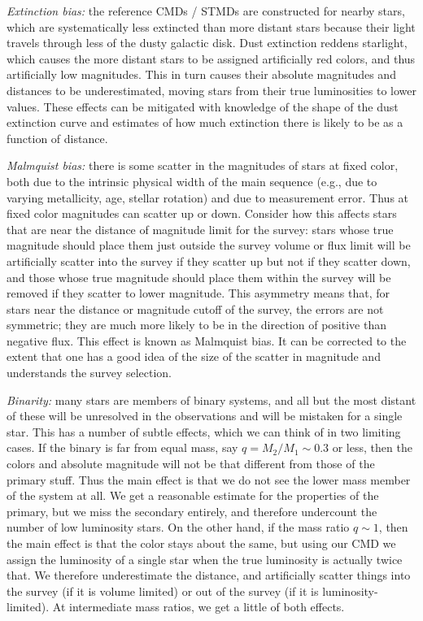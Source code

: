 \textit{Extinction bias:} the reference CMDs / STMDs are constructed for nearby stars, which are systematically less extincted than more distant stars because their light travels through less of the dusty galactic disk. Dust extinction reddens starlight, which causes the more distant stars to be assigned artificially red colors, and thus artificially low magnitudes. This in turn causes their absolute magnitudes and distances to be underestimated, moving stars from their true luminosities to lower values. These effects can be mitigated with knowledge of the shape of the dust extinction curve and estimates of how much extinction there is likely to be as a function of distance.

\textit{Malmquist bias:} there is some scatter in the magnitudes of stars at fixed color, both due to the intrinsic physical width of the main sequence (e.g., due to varying metallicity, age, stellar rotation) and due to measurement error. Thus at fixed color magnitudes can scatter up or down. Consider how this affects stars that are near the distance of magnitude limit for the survey: stars whose true magnitude should place them just outside the survey volume or flux limit will be artificially scatter into the survey if they scatter up but not if they scatter down, and those whose true magnitude should place them within the survey will be removed if they scatter to lower magnitude. This asymmetry means that, for stars near the distance or magnitude cutoff of the survey, the errors are not symmetric; they are much more likely to be in the direction of positive than negative flux. This effect is known as Malmquist bias. It can be corrected to the extent that one has a good idea of the size of the scatter in magnitude and understands the survey selection.

\textit{Binarity:} many stars are members of binary systems, and all but the most distant of these will be unresolved in the observations and will be mistaken for a single star. This has a number of subtle effects, which we can think of in two limiting cases. If the binary is far from equal mass, say $q = M_2/M_1 \sim 0.3$ or less, then the colors and absolute magnitude will not be that different from those of the primary stuff. Thus the main effect is that we do not see the lower mass member of the system at all. We get a reasonable estimate for the properties of the primary, but we miss the secondary entirely, and therefore undercount the number of low luminosity stars. On the other hand, if the mass ratio $q\sim 1$, then the main effect is that the color stays about the same, but using our CMD we assign the luminosity of a single star when the true luminosity is actually twice that. We therefore underestimate the distance, and artificially scatter things into the survey (if it is volume limited) or out of the survey (if it is luminosity-limited). At intermediate mass ratios, we get a little of both effects.

